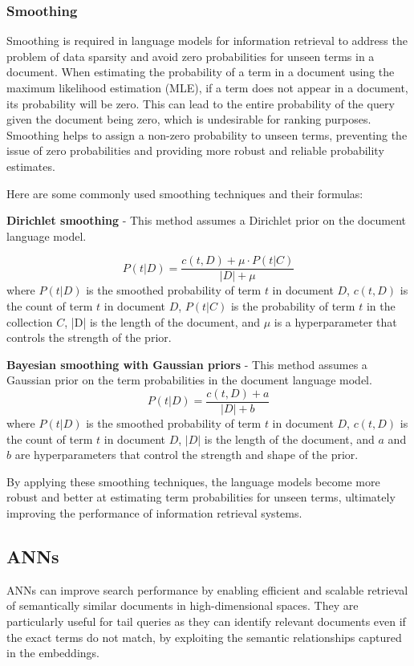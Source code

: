 \documentclass[12pt]{article}
\begin{document}
\subsubsection{Smoothing}
Smoothing is required in language models for information retrieval to address the problem of data sparsity and avoid zero probabilities for unseen terms in a document. When estimating the probability of a term in a document using the maximum likelihood estimation (MLE), if a term does not appear in a document, its probability will be zero. This can lead to the entire probability of the query given the document being zero, which is undesirable for ranking purposes. Smoothing helps to assign a non-zero probability to unseen terms, preventing the issue of zero probabilities and providing more robust and reliable probability estimates.

Here are some commonly used smoothing techniques and their formulas:

\textbf{Dirichlet smoothing} - This method assumes a Dirichlet prior on the document language model.

$$P(t|D) = \frac{c(t, D) + \mu \cdot P(t|C)}{|D| + \mu}$$
where $P(t|D)$ is the smoothed probability of term $t$ in document $D$, $c(t, D)$ is the count of term $t$ in document $D$, $P(t|C)$ is the probability of term $t$ in the collection $C$, |D| is the length of the document, and $\mu$ is a hyperparameter that controls the strength of the prior.

\textbf{Bayesian smoothing with Gaussian priors} - This method assumes a Gaussian prior on the term probabilities in the document language model.
$$P(t|D) = \frac{c(t, D) + a}{|D| + b}$$
where $P(t|D)$ is the smoothed probability of term $t$ in document $D$, $c(t, D)$ is the count of term $t$ in document $D$, $|D|$ is the length of the document, and $a$ and $b$ are hyperparameters that control the strength and shape of the prior.

By applying these smoothing techniques, the language models become more robust and better at estimating term probabilities for unseen terms, ultimately improving the performance of information retrieval systems.
\subsection{ANNs}

ANNs can improve search performance by enabling efficient and scalable retrieval of semantically similar documents in high-dimensional spaces. They are particularly useful for tail queries as they can identify relevant documents even if the exact terms do not match, by exploiting the semantic relationships captured in the embeddings.
\end{document}
